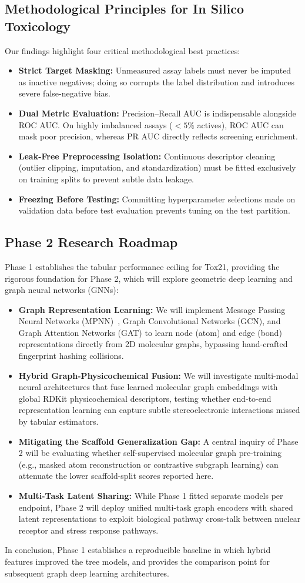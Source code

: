 \subsection{Methodological Principles for In Silico Toxicology}
Our findings highlight four critical methodological best practices:
\begin{itemize}
    \item \textbf{Strict Target Masking:} Unmeasured assay labels must never be imputed as inactive negatives; doing so corrupts the label distribution and introduces severe false-negative bias.
    \item \textbf{Dual Metric Evaluation:} Precision--Recall AUC is indispensable alongside ROC AUC. On highly imbalanced assays ($<5\%$ actives), ROC AUC can mask poor precision, whereas PR AUC directly reflects screening enrichment.
    \item \textbf{Leak-Free Preprocessing Isolation:} Continuous descriptor cleaning (outlier clipping, imputation, and standardization) must be fitted exclusively on training splits to prevent subtle data leakage.
    \item \textbf{Freezing Before Testing:} Committing hyperparameter selections made on validation data before test evaluation prevents tuning on the test partition.
\end{itemize}

\subsection{Phase 2 Research Roadmap}
Phase 1 establishes the tabular performance ceiling for Tox21, providing the rigorous foundation for Phase 2, which will explore geometric deep learning and graph neural networks (GNNs):
\begin{itemize}
    \item \textbf{Graph Representation Learning:} We will implement Message Passing Neural Networks (MPNN)~\cite{gilmer2017neural}, Graph Convolutional Networks (GCN), and Graph Attention Networks (GAT) to learn node (atom) and edge (bond) representations directly from 2D molecular graphs, bypassing hand-crafted fingerprint hashing collisions.
    \item \textbf{Hybrid Graph-Physicochemical Fusion:} We will investigate multi-modal neural architectures that fuse learned molecular graph embeddings with global RDKit physicochemical descriptors, testing whether end-to-end representation learning can capture subtle stereoelectronic interactions missed by tabular estimators.
    \item \textbf{Mitigating the Scaffold Generalization Gap:} A central inquiry of Phase 2 will be evaluating whether self-supervised molecular graph pre-training (e.g., masked atom reconstruction or contrastive subgraph learning) can attenuate the lower scaffold-split scores reported here.
    \item \textbf{Multi-Task Latent Sharing:} While Phase 1 fitted separate models per endpoint, Phase 2 will deploy unified multi-task graph encoders with shared latent representations to exploit biological pathway cross-talk between nuclear receptor and stress response pathways.
\end{itemize}

In conclusion, Phase 1 establishes a reproducible baseline in which hybrid features improved the tree models, and provides the comparison point for subsequent graph deep learning architectures.
